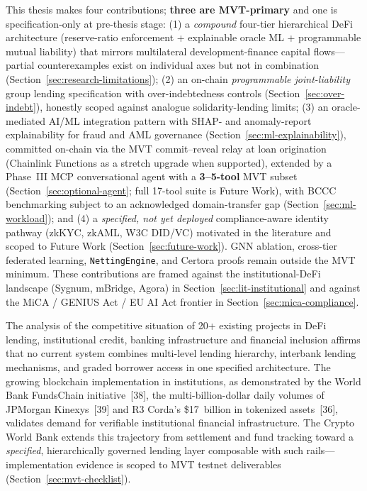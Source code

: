 \documentclass[12pt,a4paper]{report}
\begin{document}
\label{sec:research-contribution}
This thesis makes four contributions; \textbf{three are MVT-primary} and one is specification-only at pre-thesis stage: (1) a \textit{compound} four-tier hierarchical DeFi architecture (reserve-ratio enforcement + explainable oracle ML + programmable mutual liability) that mirrors multilateral development-finance capital flows---partial counterexamples exist on individual axes but not in combination (Section~\ref{sec:research-limitations}); (2) an on-chain \textit{programmable joint-liability} group lending specification with over-indebtedness controls (Section~\ref{sec:over-indebt}), honestly scoped against analogue solidarity-lending limits; (3) an oracle-mediated AI/ML integration pattern with SHAP- and anomaly-report explainability for fraud and AML governance (Section~\ref{sec:ml-explainability}), committed on-chain via the MVT commit--reveal relay at loan origination (Chainlink Functions as a stretch upgrade when supported), extended by a Phase~III MCP conversational agent with a \textbf{3--5-tool} MVT subset (Section~\ref{sec:optional-agent}; full 17-tool suite is Future Work), with BCCC benchmarking subject to an acknowledged domain-transfer gap (Section~\ref{sec:ml-workload}); and (4) a \textit{specified, not yet deployed} compliance-aware identity pathway (zkKYC, zkAML, W3C DID/VC) motivated in the literature and scoped to Future Work (Section~\ref{sec:future-work}). GNN ablation, cross-tier federated learning, \texttt{NettingEngine}, and Certora proofs remain outside the MVT minimum. These contributions are framed against the institutional-DeFi landscape (Sygnum, mBridge, Agora) in Section~\ref{sec:lit-institutional} and against the MiCA / GENIUS Act / EU AI Act frontier in Section~\ref{sec:mica-compliance}.

The analysis of the competitive situation of 20+ existing projects in DeFi lending, institutional credit, banking infrastructure and financial inclusion affirms that no current system combines multi-level lending hierarchy, interbank lending mechanisms, and graded borrower access in one specified architecture. The growing blockchain implementation in institutions, as demonstrated by the World Bank FundsChain initiative~[38], the multi-billion-dollar daily volumes of JPMorgan Kinexys~[39] and R3 Corda's \$17~billion in tokenized assets~[36], validates demand for verifiable institutional financial infrastructure. The Crypto World Bank extends this trajectory from settlement and fund tracking toward a \textit{specified}, hierarchically governed lending layer composable with such rails---implementation evidence is scoped to MVT testnet deliverables (Section~\ref{sec:mvt-checklist}).
\end{document}
